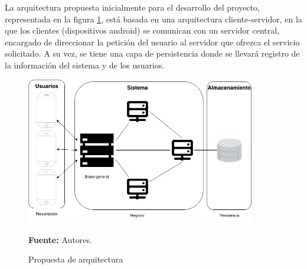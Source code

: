 La arquitectura propuesta inicialmente para el desarrollo del proyecto, representada en la figura \ref{fig:arqui_prop}, está basada en una arquitectura cliente-servidor, en la que los clientes (dispositivos android) se comunican con un servidor central, encargado de direccionar la petición del usuario al servidor que ofrezca el servicio solicitado. A su vez, se tiene una capa de persistencia donde se llevará registro de la información del sistema y de los usuarios.

\begin{figure}[!htb]
  \begin{center}
    \includegraphics[width=10cm]{./imagenes/arquitectura_propuesta.jpg}
    \caption{Propuesta de arquitectura}
    \label{fig:arqui_prop}
    \textbf{Fuente:} Autores.
  \end{center}
\end{figure}
